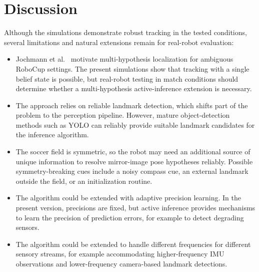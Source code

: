 \section{Discussion}
\label{sec:discussion}
Although the simulations demonstrate robust tracking in the tested conditions, several limitations and natural extensions remain for real-robot evaluation:
\begin{itemize}
    \item Jochmann et al.~\cite{jochmann_efficient_2012} motivate multi-hypothesis localization for ambiguous RoboCup settings. The present simulations show that tracking with a single belief state is possible, but real-robot testing in match conditions should determine whether a multi-hypothesis active-inference extension is necessary.
    \item The approach relies on reliable landmark detection, which shifts part of the problem to the perception pipeline. However, mature object-detection methods such as YOLO can reliably provide suitable landmark candidates for the inference algorithm.
    \item The soccer field is symmetric, so the robot may need an additional source of unique information to resolve mirror-image pose hypotheses reliably. Possible symmetry-breaking cues include a noisy compass cue, an external landmark outside the field, or an initialization routine.
    \item The algorithm could be extended with adaptive precision learning. In the present version, precisions are fixed, but active inference provides mechanisms to learn the precision of prediction errors, for example to detect degrading sensors.
    \item The algorithm could be extended to handle different frequencies for different sensory streams, for example accommodating higher-frequency IMU observations and lower-frequency camera-based landmark detections.
\end{itemize}
